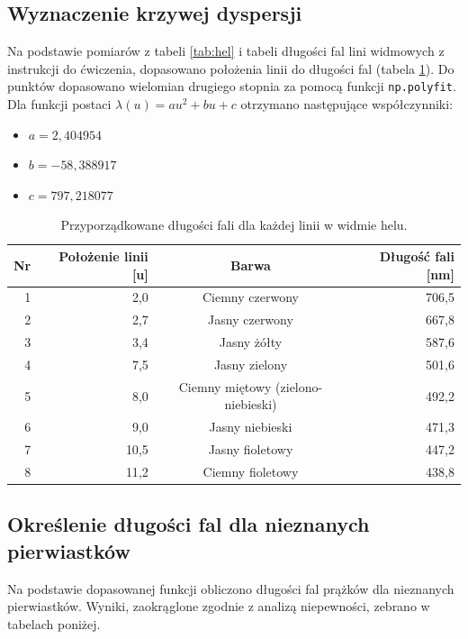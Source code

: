 \documentclass[a4paper,12pt]{article}
\begin{document}
\subsection{Wyznaczenie krzywej dyspersji}

Na podstawie pomiarów z tabeli \ref{tab:hel} i tabeli długości fal lini widmowych z instrukcji do ćwiczenia, dopasowano położenia linii do długości fal (tabela \ref{tab:hel_dispersion}). Do punktów dopasowano wielomian drugiego stopnia za pomocą funkcji \texttt{np.polyfit}. Dla funkcji postaci $\lambda(u) = au^2 + bu + c$ otrzymano następujące współczynniki:
\begin{itemize}
    \item $a = 2{,}404954$
    \item $b = -58{,}388917$
    \item $c = 797{,}218077$
\end{itemize}

\begin{table}[H]
    \centering
    \begin{tabular}{|r|r|c|r|}
        \hline
        Nr & Położenie linii [u] & Barwa  & Długość fali [nm] \\ \hline
        1 & 2{,}0 & Ciemny czerwony & 706,5  \\ \hline
        2 & 2{,}7 & Jasny czerwony & 667,8\\ \hline
        3 & 3{,}4 & Jasny żółty & 587,6 \\ \hline
        4 & 7{,}5 & Jasny zielony & 501,6 \\ \hline
        5 & 8{,}0 & Ciemny miętowy (zielono-niebieski) & 492,2\\ \hline
        6 & 9{,}0 & Jasny niebieski & 471,3 \\ \hline
        7 & 10{,}5 & Jasny fioletowy & 447,2 \\ \hline
        8 & 11{,}2 & Ciemny fioletowy & 438,8 \\ \hline
    \end{tabular}
    \caption{Przyporządkowane długości fali dla każdej linii w widmie helu.}
    \label{tab:hel_dispersion}
\end{table}

\subsection{Określenie długości fal dla nieznanych pierwiastków}

Na podstawie dopasowanej funkcji obliczono długości fal prążków dla nieznanych pierwiastków. Wyniki, zaokrąglone zgodnie z analizą niepewności, zebrano w tabelach poniżej.
\end{document}
